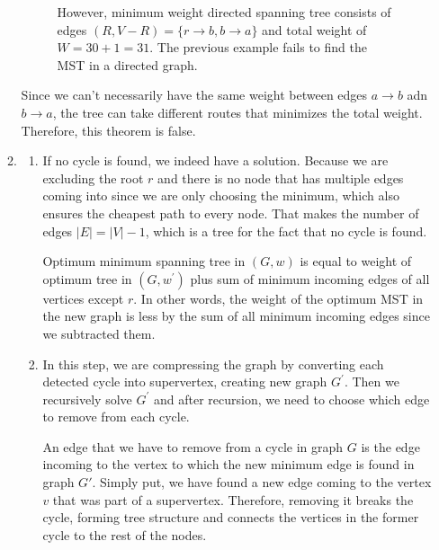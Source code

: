\documentclass{article}
\begin{document}
\begin{enumerate}
\begin{enumerate}
\begin{figure}[H]
\begin{minipage}{0.4\textwidth}
          \caption{However, minimum weight directed spanning tree consists of edges $(R,V-R)=\{r\rightarrow b,b\rightarrow a\}$ and total weight of $W=30+1=31$. The previous example fails to find the MST in a directed graph.}
        \end{minipage}
      \end{figure}

      Since we can't necessarily have the same weight between edges $a\rightarrow b$ adn $b\rightarrow a$, the tree can take different routes that minimizes the total weight. Therefore, this theorem is false.

      \item
      \begin{enumerate}
        \item If no cycle is found, we indeed have a solution.
        Because we are excluding the root $r$ and there is no node that has multiple edges coming into since we are only choosing the minimum, which also ensures the cheapest path to every node.
        That makes the number of edges $|E|=|V|-1$, which is a tree for the fact that no cycle is found.

        Optimum minimum spanning tree in $(G,w)$ is equal to weight of optimum tree in $(G,w^\prime)$ plus sum of minimum incoming edges of all vertices except $r$.
        In other words, the weight of the optimum MST in the new graph is less by the sum of all minimum incoming edges since we subtracted them.

        \item In this step, we are compressing the graph by converting each detected cycle into supervertex, creating new graph $G^\prime$.
        Then we recursively solve $G^\prime$ and after recursion, we need to choose which edge to remove from each cycle.

        An edge that we have to remove from a cycle in graph $G$ is the edge incoming to the vertex to which the new minimum edge is found in graph $G'$.
        Simply put, we have found a new edge coming to the vertex $v$ that was part of a supervertex.
        Therefore, removing it breaks the cycle, forming tree structure and connects the vertices in the former cycle to the rest of the nodes.


\end{enumerate}
\end{enumerate}
\end{enumerate}
\end{document}
